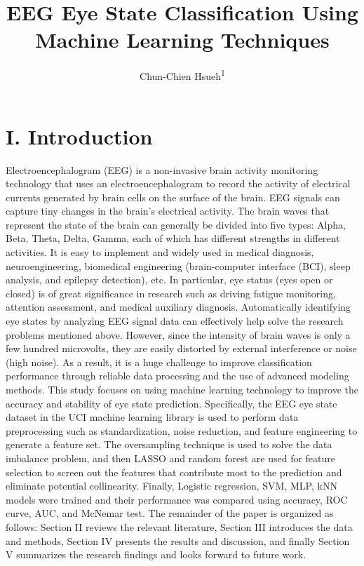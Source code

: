 \documentclass[
  doc]{apa6}
\title{EEG Eye State Classification Using Machine Learning Techniques}
\author{Chun-Chien Hsueh\textsuperscript{1}}
\date{}
\affiliation{\vspace{0.5cm}\textsuperscript{1} Department of Statistics, Rutgers University}
\begin{document}
\maketitle

\newpage

\section{I. Introduction}\label{i.-introduction}

Electroencephalogram (EEG) is a non-invasive brain activity monitoring technology that uses an electroencephalogram to record the activity of electrical currents generated by brain cells on the surface of the brain. EEG signals can capture tiny changes in the brain's electrical activity. The brain waves that represent the state of the brain can generally be divided into five types: Alpha, Beta, Theta, Delta, Gamma, each of which has different strengths in different activities. It is easy to implement and widely used in medical diagnosis, neuroengineering, biomedical engineering (brain-computer interface (BCI), sleep analysis, and epilepsy detection), etc. In particular, eye status (eyes open or closed) is of great significance in research such as driving fatigue monitoring, attention assessment, and medical auxiliary diagnosis. Automatically identifying eye states by analyzing EEG signal data can effectively help solve the research problems mentioned above. However, since the intensity of brain waves is only a few hundred microvolts, they are easily distorted by external interference or noise (high noise). As a result, it is a huge challenge to improve classification performance through reliable data processing and the use of advanced modeling methods.
This study focuses on using machine learning technology to improve the accuracy and stability of eye state prediction. Specifically, the EEG eye state dataset in the UCI machine learning library is used to perform data preprocessing such as standardization, noise reduction, and feature engineering to generate a feature set. The oversampling technique is used to solve the data imbalance problem, and then LASSO and random forest are used for feature selection to screen out the features that contribute most to the prediction and eliminate potential collinearity. Finally, Logistic regression, SVM, MLP, kNN models were trained and their performance was compared using accuracy, ROC curve, AUC, and McNemar test. The remainder of the paper is organized as follows: Section II reviews the relevant literature, Section III introduces the data and methods, Section IV presents the results and discussion, and finally Section V summarizes the research findings and looks forward to future work.
\end{document}
